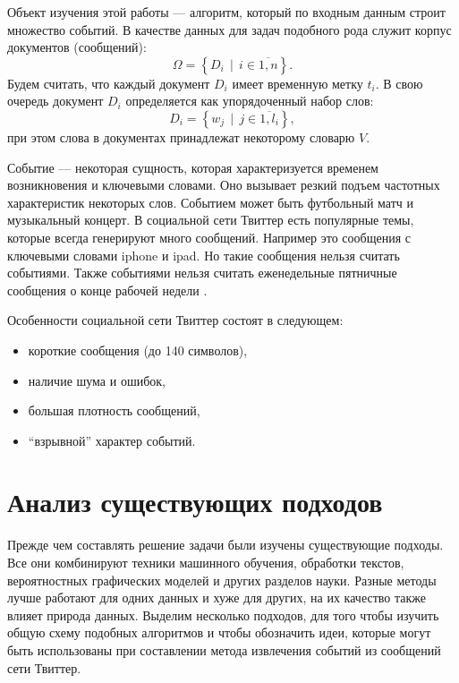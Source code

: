 \documentclass[12pt, a4paper]{article}
\DeclareMathOperator{\svert}{\,\vert\,}
\begin{document}
  Объект изучения этой работы --- алгоритм, который по входным данным строит множество событий. В качестве данных для задач подобного рода служит корпус документов (сообщений):
\begin{equation}
  \Omega = \left\{D_i \svert i \in \overline{1,n} \right\}.
  \end{equation}  
  Будем считать, что каждый документ $D_i$ имеет временную метку $t_i$. В свою очередь документ $D_i$ определяется как упорядоченный набор слов:
\begin{equation}
  D_i = \left\{w_j \svert j \in \overline{ 1, l_i } \right\},
  \end{equation}  
   при этом слова в документах принадлежат некоторому словарю $V$. 
  
  Событие --- некоторая сущность, которая характеризуется временем возникновения и ключевыми словами. Оно вызывает резкий подъем частотных характеристик некоторых слов. Событием может быть футбольный матч и музыкальный концерт. В социальной сети Твиттер есть популярные темы, которые всегда генерируют много сообщений. Например это сообщения с ключевыми словами iphone и ipad. Но такие сообщения нельзя считать событиями. Также событиями нельзя считать еженедельные пятничные сообщения о конце рабочей недели \cite{waim13}.
  
  Особенности социальной сети Твиттер состоят в следующем:
  \begin{itemize}
  \item короткие сообщения (до 140 символов),
  \item наличие шума и ошибок,
  \item большая плотность сообщений,
  \item ``взрывной'' характер событий.
  \end{itemize}
  
  \section{Анализ существующих подходов}
  Прежде чем составлять решение задачи были изучены существующие подходы. Все они комбинируют техники машинного обучения, обработки текстов, вероятностных графических моделей и других разделов науки. Разные методы лучше работают для одних данных и хуже для других, на их качество также влияет природа данных. Выделим несколько подходов, для того чтобы изучить общую схему подобных алгоритмов и чтобы обозначить идеи, которые могут быть использованы при составлении метода извлечения событий из сообщений сети Твиттер.
  
\end{document}
